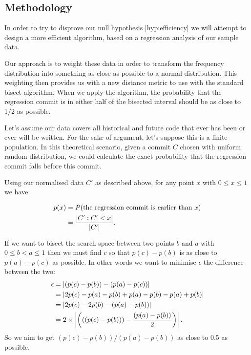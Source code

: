 \documentclass[10pt,journal,compsoc]{IEEEtran}
\begin{document}
\subsection{Methodology}

In order to try to disprove our null hypothesis \ref{hyp:efficiency} we will attempt to design a more efficient algorithm, based on a regression analysis of our sample data.

Our approach is to weight these data in order to transform the frequency distribution into something as close as possible to a normal distribution. This weighting then provides us with a new distance metric to use with the standard bisect algorithm. When we apply the algorithm, the probability that the regression commit is in either half of the bisected interval should be as close to $1/2$ as possible.

Let's assume our data covers all historical and future code that ever has been or ever will be written. For the sake of argument, let's suppose this is a finite population. In this theoretical scenario, given a commit $C$ chosen with uniform random distribution, we could calculate the exact probability that the regression commit falls before this commit.

Using our normalised data $C'$ as described above, for any point $x$ with $0 \le x \le 1$ we have

\begin{align*}
p(x) & = P( \text{the regression commit is earlier than } x) \\
    & = \frac{\left|  C' : C' < x  \right|}{ \left|  C'  \right|} .
\end{align*}

If we want to bisect the search space between two points $b$ and $a$ with $0 \le b < a \le 1$ then we must find $c$ so that $p(c) - p(b)$ is as close to $p(a) - p(c)$ as possible. In other words we want to minimise $\epsilon$ the difference between the two:
\begin{align*}
\epsilon & = \left| (p(c) - p(b)) - (p(a) - p(c)) \right| \\
         & = \left| 2p(c) - p(a) - p(b) + p(a) - p(b) - p(a) + p(b) \right| \\
         & = \left| 2p(c) - 2p(b) - (p(a) - p(b)) \right| \\
         & = 2 \times \left| \left(((p(c) - p(b))) - \frac{(p(a) - p(b))}{2} \right) \right| .
\end{align*}
So we aim to get $(p(c) - p(b)) / (p(a) - p(b))$ as close to 0.5 as possible.
\end{document}
